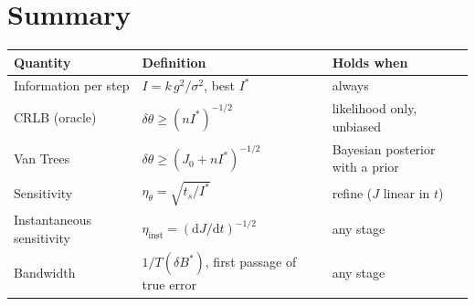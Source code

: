 \documentclass[11pt]{article}
\newcommand{\dd}{\mathrm{d}}
\newcommand{\Istar}{I^{\ast}}
\begin{document}
\section{Summary}
\begin{center}
\small
\begin{tabular}{@{}lll@{}}
\toprule
Quantity & Definition & Holds when\\
\midrule
Information per step & $I=k\,g^2/\sigma^2$, best $\Istar$ & always\\
CRLB (oracle) & $\delta\theta\ge(n\Istar)^{-1/2}$ & likelihood only, unbiased\\
Van Trees & $\delta\theta\ge(J_0+n\Istar)^{-1/2}$ & Bayesian posterior with a prior\\
Sensitivity & $\eta_\theta=\sqrt{t_s/\Istar}$ & refine ($J$ linear in $t$)\\
Instantaneous sensitivity & $\eta_{\mathrm{inst}}=(\dd J/\dd t)^{-1/2}$ & any stage\\
Bandwidth & $1/T(\delta B^{\ast})$, first passage of true error & any stage\\
\bottomrule
\end{tabular}
\end{center}
\end{document}
